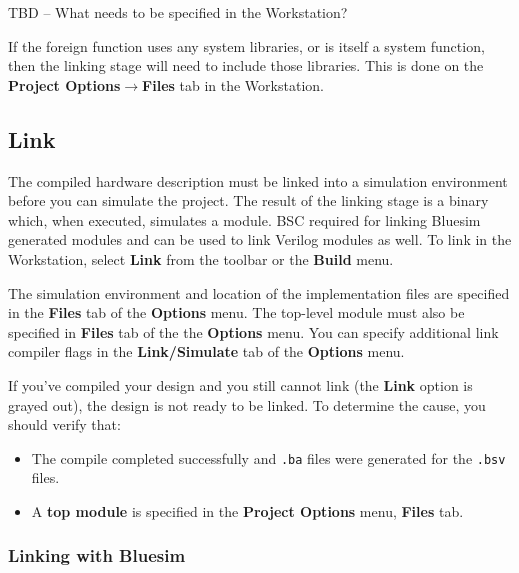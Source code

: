 \documentclass{article}
\newcommand{\te}[1]{\texttt{#1}}
\begin{document}
TBD -- What needs to be specified in the Workstation?

If the foreign function uses any
system libraries, or is itself a system function, then the linking stage
will need to include those libraries.  This is done on  the
{\bf Project Options$\rightarrow$Files} tab in the Workstation.


\subsection{Link}
\label{linking}

The compiled  hardware description  must be linked into a simulation
environment before you can simulate the project.  The result of the linking
stage is a binary which, when executed,
simulates a module.
BSC required for linking  Bluesim generated modules and can
be used to link Verilog modules as well.
To link in the Workstation, select {\bf Link} from the toolbar or the
{\bf Build} menu.

The simulation environment and location of the implementation files are
specified in the  {\bf Files} tab of the {\bf Options} menu.
The top-level module must also be specified in {\bf Files} tab of the
the  {\bf Options} menu.
You can specify additional link compiler flags
in the {\bf Link/Simulate} tab of the {\bf Options} menu.

If you've compiled your design and you still cannot link (the {\bf
Link} option is grayed out), the design is  not ready to be
linked.  To determine the cause, you should verify that:
\begin{itemize}
\item  The compile completed successfully and \te{.ba}
files were generated for  the \te{.bsv} files.
\item  A {\bf top module} is specified in the {\bf
Project Options} menu, {\bf Files} tab.
\end{itemize}


\subsubsection{Linking with Bluesim}
\end{document}
